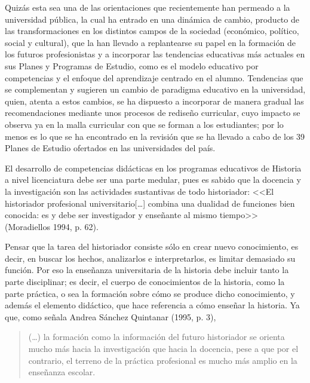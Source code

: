 Quizás esta sea una de las orientaciones que recientemente han permeado 
a la universidad pública, la cual ha entrado en una dinámica de cambio, 
producto de las transformaciones en los distintos campos de la 
sociedad (económico, político, social y cultural), que la han llevado a 
replantearse su papel en la formación de los futuros profesionistas y a 
incorporar las tendencias educativas más actuales en sus Planes y 
Programas de Estudio, como es el modelo educativo por competencias y el 
enfoque del aprendizaje centrado en el alumno.  Tendencias que se 
complementan y sugieren un cambio de paradigma educativo en la 
universidad, quien, atenta a estos cambios, se ha dispuesto a incorporar 
de manera gradual las recomendaciones mediante unos procesos de rediseño 
curricular, cuyo impacto se observa ya en la malla curricular con que se 
forman a los estudiantes; por lo menos es lo que se ha encontrado en la 
revisión que se ha llevado a cabo de los 39 Planes de Estudio ofertados 
en las universidades del país. 
\enlargethispage{-1\baselineskip}

El desarrollo de competencias didácticas en los programas educativos de 
Historia a nivel licenciatura debe ser una parte medular, pues es 
sabido que la docencia y  la investigación  son las actividades 
sustantivas de todo historiador: <<El historiador profesional 
universitario[\ldots] combina una dualidad de funciones bien conocida: es y 
debe ser investigador y enseñante al mismo tiempo>> (Moradiellos 
1994, p. 62). 

Pensar que la tarea del historiador consiste sólo en  crear nuevo 
conocimiento, es decir, en buscar los hechos, analizarlos e 
interpretarlos, es limitar demasiado su función. Por eso la enseñanza 
universitaria de la historia debe incluir tanto la parte disciplinar; 
es decir, el cuerpo de conocimientos de la historia,  como la parte 
práctica, o sea la formación sobre cómo se produce dicho conocimiento, 
y además el elemento didáctico, que hace referencia a cómo enseñar la 
historia. Ya que, como señala Andrea Sánchez Quintanar (1995, p. 3), 

\begin{quotation}
(\ldots) la formación como la información del futuro historiador se orienta 
mucho más hacia la investigación que hacia la docencia, pese a que por el 
contrario, el terreno de la práctica profesional es mucho más amplio en 
la enseñanza escolar. 
\end{quotation}

